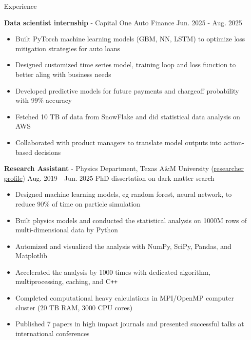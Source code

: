 \documentclass{resume}
\begin{document}
\begin{rSection}{Experience}
    \vspace{-1.5em}
    \item \textbf{Data scientist internship} - Capital One Auto Finance \hfill Jun. 2025 - Aug. 2025
        \begin{itemize}
        \item Built PyTorch machine learning models (GBM, NN, LSTM) to optimize loss mitigation strategies for auto loans
        \item Designed customized time series model, training loop and loss function to better aling with business needs
        \item Developed predictive models for future payments and chargeoff probability with 99\% accuracy
        \item Fetched 10 TB of data from SnowFlake and did statistical data analysis on AWS
        \item Collaborated with product managers to translate model outputs into action-based decisions
        \end{itemize}

    \vspace{0.4em}
    \item \textbf{Research Assistant} - Physics Department, Texas A\&M University (\href{https://inspirehep.net/authors/2661451}{researcher profile}) \hfill Aug. 2019 - Jun. 2025
        \newline\hspace*{0.5em} {\normalsize PhD dissertation on dark matter search}
        \begin{itemize}
        \item Designed machine learning models, eg random forest, neural network, to reduce 90\% of time on particle simulation
        \item Built physics models and conducted the statistical analysis on 1000M rows of multi-dimensional data by Python
        \item Automized and visualized the analysis with NumPy, SciPy, Pandas, and Matplotlib
        \item Accelerated the analysis by 1000 times with dedicated algorithm, multiprocessing, caching, and C\texttt{++}
        \item Completed computational heavy calculations in MPI/OpenMP computer cluster (20 TB RAM, 3000 CPU cores)
        \item Published 7 papers in high impact journals and presented successful talks at international conferences
        \end{itemize}


\end{rSection}
\end{document}

